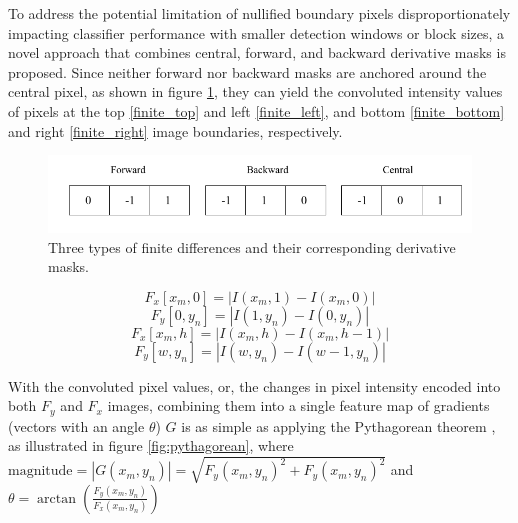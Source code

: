 To address the potential limitation of nullified boundary pixels disproportionately impacting classifier performance with smaller detection windows or block sizes, a novel approach that combines central, forward, and backward derivative masks \cite{niebles2012edge} is proposed. Since neither forward nor backward masks are anchored around the central pixel, as shown in figure \ref{fig:finite_differences}, they can yield the convoluted intensity values of pixels at the top \ref{finite_top} and left \ref{finite_left}, and bottom \ref{finite_bottom} and right \ref{finite_right} image boundaries, respectively.

\begin{figure}
    \centering
    \includegraphics[width=0.75\linewidth]{images/finite_differences.png}
    \caption{Three types of finite differences and their corresponding derivative masks.}
    \label{fig:finite_differences}
\end{figure}

\begin{equation}
    \label{finite_top}
    F_{x}[x_{m},0] =  | I(x_{m},1)-I(x_{m},0) | 
\end{equation}
\begin{equation}
    \label{finite_left}
    F_{y}[0,y_{n}] =  | I(1,y_{n})-I(0,y_{n}) |
\end{equation}
\begin{equation}
    \label{finite_bottom}
    F_{x}[x_{m},h] =  | I(x_{m},h)-I(x_{m},h-1) |
\end{equation}
\begin{equation}
    \label{finite_right}
    F_{y}[w,y_{n}] =  | I(w,y_{n})-I(w-1,y_{n}) |
\end{equation}

With the convoluted pixel values, or, the changes in pixel intensity encoded into both $F_y$ and $F_x$ images, combining them into a single feature map of gradients (vectors with an angle $\theta$) $G$ is as simple as applying the Pythagorean theorem \cite{shidlovskiy_2020_reducing}, as illustrated in figure \ref{fig:pythagorean}, where $ \text{magnitude} = | G(x_{m},y_{n}) | = \sqrt{ F_{y}(x_{m},y_{n})^2+F_{y}(x_{m},y_{n})^2 }$ and $\theta = \arctan \left( \frac{F_{y}(x_{m},y_{n})}{F_{x}(x_{m},y_{n})} \right) $

